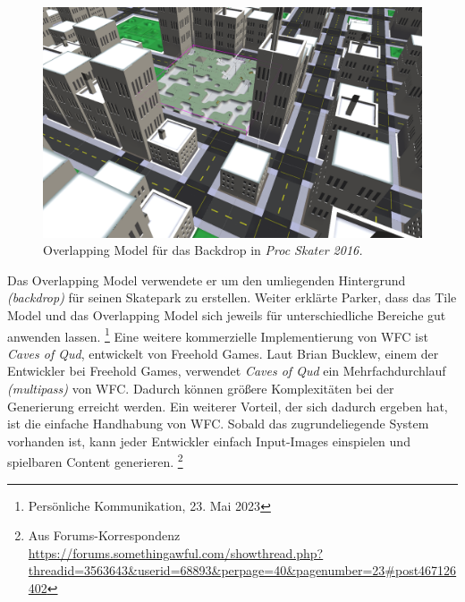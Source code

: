 \documentclass[12pt, a4paper,twoside,openright]{report} %
\begin{document}
\begin{figure}
    \includegraphics[width=1\linewidth]{images/proc-skate-backdrop.png}%
    \caption{Overlapping Model für das Backdrop in \textit{Proc Skater 2016.} \cite{procskater2016}}%
\end{figure}

Das Overlapping Model verwendete er um den umliegenden Hintergrund \textit{(backdrop)} für seinen Skatepark zu erstellen.
Weiter erklärte Parker, dass das Tile Model und das Overlapping Model sich jeweils für unterschiedliche Bereiche gut anwenden lassen.
\footnote[5]{Persönliche Kommunikation, 23. Mai 2023}
\newline
Eine weitere kommerzielle Implementierung von WFC ist \textit{Caves of Qud}, entwickelt von Freehold Games.
Laut Brian Bucklew, einem der Entwickler bei Freehold Games, verwendet \textit{Caves of Qud} ein Mehrfachdurchlauf \textit{(multipass)} von WFC.
Dadurch können größere Komplexitäten bei der Generierung erreicht werden.
Ein weiterer Vorteil, der sich dadurch ergeben hat, ist die einfache Handhabung von WFC.
Sobald das zugrundeliegende System vorhanden ist, kann jeder Entwickler einfach Input-Images einspielen und spielbaren Content generieren.
\footnote[6]{Aus Forums-Korrespondenz \url{https://forums.somethingawful.com/showthread.php?threadid=3563643&userid=68893&perpage=40&pagenumber=23\#post467126402}} \cite{Karth2017WaveFunctionCollapseIC}
\end{document}
